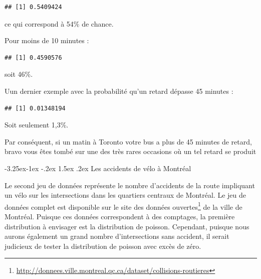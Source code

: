 \documentclass[
  11pt,
  french,
]{book}
\makeatletter
\newenvironment{Shaded}{\begin{snugshade}}{\end{snugshade}}
\newcommand{\DataTypeTok}[1]{\textcolor[rgb]{0.13,0.29,0.53}{#1}}
\newcommand{\DecValTok}[1]{\textcolor[rgb]{0.00,0.00,0.81}{#1}}
\newcommand{\KeywordTok}[1]{\textcolor[rgb]{0.13,0.29,0.53}{\textbf{#1}}}
\newcommand{\NormalTok}[1]{#1}
\newcommand{\OperatorTok}[1]{\textcolor[rgb]{0.81,0.36,0.00}{\textbf{#1}}}
\renewcommand{\href}[2]{#2\footnote{\url{#1}}}
\newenvironment{kframe}{%
\medskip{}
\setlength{\fboxsep}{.8em}
 \def\at@end@of@kframe{}%
 \ifinner\ifhmode%
  \def\at@end@of@kframe{\end{minipage}}%
  \begin{minipage}{\columnwidth}%
 \fi\fi%
 \def\FrameCommand##1{\hskip\@totalleftmargin \hskip-\fboxsep
 \colorbox{shadecolor}{##1}\hskip-\fboxsep
     \hskip-\linewidth \hskip-\@totalleftmargin \hskip\columnwidth}%
 \MakeFramed {\advance\hsize-\width
   \@totalleftmargin\z@ \linewidth\hsize
   \@setminipage}}%
 {\par\unskip\endMakeFramed%
 \at@end@of@kframe}
\renewenvironment{Shaded}{\begin{kframe}}{\end{kframe}}
\renewcommand\paragraph{\@startsection{paragraph}{4}{\z@}%
   {-3.25ex\@plus -1ex \@minus -.2ex}%
   {1.5ex \@plus .2ex}%
   {\normalfont\normalsize\bfseries}}
\makeatother
\begin{document}
\begin{verbatim}
## [1] 0.5409424
\end{verbatim}

ce qui correspond à 54\% de chance.

Pour moins de 10 minutes :

\begin{Shaded}
\end{Shaded}

\begin{verbatim}
## [1] 0.4590576
\end{verbatim}

soit 46\%.

Uun dernier exemple avec la probabilité qu'un retard dépasse 45 minutes :

\begin{Shaded}
\end{Shaded}

\begin{verbatim}
## [1] 0.01348194
\end{verbatim}

Soit seulement 1,3\%.

Par conséquent, si un matin à Toronto votre bus a plus de 45 minutes de retard, bravo vous êtes tombé sur une des très rares occasions où un tel retard se produit

\hypertarget{les-accidents-de-vuxe9lo-uxe0-montruxe9al}{%
\paragraph{Les accidents de vélo à Montréal}\label{les-accidents-de-vuxe9lo-uxe0-montruxe9al}}

Le second jeu de données représente le nombre d'accidents de la route impliquant un vélo sur les intersections dans les quartiers centraux de Montréal. Le jeu de données complet est disponible sur le site des \href{http://donnees.ville.montreal.qc.ca/dataset/collisions-routieres}{données ouvertes} de la ville de Montréal. Puisque ces données correspondent à des comptages, la première distribution à envisager est la distribution de poisson. Cependant, puisque nous aurons également un grand nombre d'intersections sans accident, il serait judicieux de tester la distribution de poisson avec excès de zéro.
\end{document}
